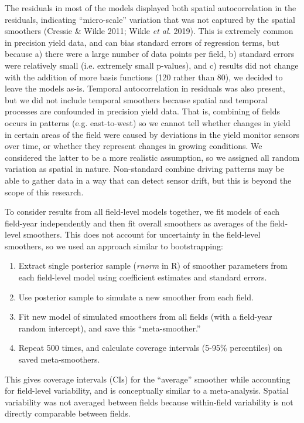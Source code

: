 \documentclass[]{elsarticle} %
\providecommand{\tightlist}{%
  \setlength{\itemsep}{0pt}\setlength{\parskip}{0pt}}
\begin{document}
The residuals in most of the models displayed both spatial autocorrelation in the residuals, indicating ``micro-scale'' variation that was not captured by the spatial smoothers (Cressie \& Wikle 2011; Wikle \emph{et al.} 2019).
This is extremely common in precision yield data, and can bias standard errors of regression terms, but because a) there were a large number of data points per field, b) standard errors were relatively small (i.e. extremely small p-values), and c) results did not change with the addition of more basis functions (120 rather than 80), we decided to leave the models as-is.
Temporal autocorrelation in residuals was also present, but we did not include temporal smoothers because spatial and temporal processes are confounded in precision yield data.
That is, combining of fields occurs in patterns (e.g. east-to-west) so we cannot tell whether changes in yield in certain areas of the field were caused by deviations in the yield monitor sensors over time, or whether they represent changes in growing conditions.
We considered the latter to be a more realistic assumption, so we assigned all random variation as spatial in nature.
Non-standard combine driving patterns may be able to gather data in a way that can detect sensor drift, but this is beyond the scope of this research.

To consider results from all field-level models together, we fit models of each field-year independently and then fit overall smoothers as averages of the field-level smoothers.
This does not account for uncertainty in the field-level smoothers, so we used an approach similar to bootstrapping:

\begin{enumerate}
\def\labelenumi{\arabic{enumi}.}
\tightlist
\item Extract single posterior sample (\emph{rnorm} in R) of smoother parameters from each field-level model using coefficient estimates and standard errors.
\item Use posterior sample to simulate a new smoother from each field.
\item Fit new model of simulated smoothers from all fields (with a field-year random intercept), and save this ``meta-smoother.''
\item Repeat 500 times, and calculate coverage intervals (5-95\% percentiles) on saved meta-smoothers.
\end{enumerate}

This gives coverage intervals (CIs) for the ``average'' smoother while accounting for field-level variability, and is conceptually similar to a meta-analysis.
Spatial variability was not averaged between fields because within-field variability is not directly comparable between fields.
\end{document}
